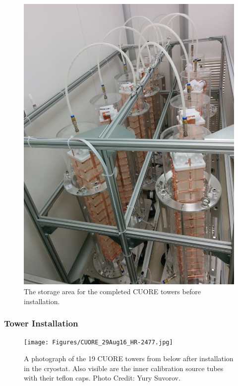 \begin{figure}[htbp]
    \centering
    \includegraphics[width=0.5\linewidth]{Figures/cuore_towers_pic1.jpg}
    \caption[The storage area for the completed CUORE towers before installation.]
    {The storage area for the completed CUORE towers before installation.}
    \label{fig:tower_storage}
\end{figure}

\subsubsection{Tower Installation}


\begin{figure} [htbp]
    \centering
    \texttt{[image: Figures/CUORE\_29Aug16\_HR-2477.jpg]}
    \caption[A photograph of the 19 CUORE towers from below.
    Photo Credit: Yury Suvorov.]
    {A photograph of the 19 CUORE towers from below after installation in the cryostat.
    Also visible are the inner calibration source tubes with their teflon caps.
    Photo Credit: Yury Suvorov.}
    \label{fig:cuore_photograph}
\end{figure}


